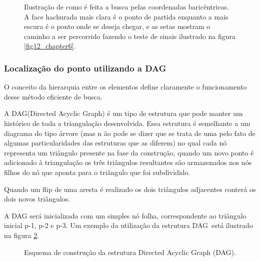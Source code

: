 \documentclass[12pt,a4paper]{book}
\begin{document}
\begin{figure}[htbp]
  \begin{center}
    \leavevmode
    
    \caption{Ilustra\c{c}\~{a}o de como \'e feita a busca pelas coordenadas baric\^entricas. A face hachurada mais clara \'e o ponto de partida enquanto a mais escura \'e o ponto onde se deseja chegar, e as setas mostram o caminho a ser percorrido fazendo o teste de sinais ilustrado na figura \ref{fig12_chapter6}.}
    \label{baricentricas}
  \end{center}
\end{figure}


\subsubsection{Localiza\c{c}\~{a}o do ponto utilizando a DAG} 

O conceito da hierarquia entre os elementos define claramente o
funcionamento desse m\'{e}todo eficiente de busca.

A DAG(Directed Acyclic Graph) \'{e} um tipo de estrutura que pode manter um
hist\'{o}rico de toda a triangula\c{c}\~{a}o desenvolvida. Essa estrutura 
\'{e} semelhante a um diagrama do tipo \'{a}rvore (mas n%
\~{a}o pode se dizer que se trata de uma pelo fato de algumas
particularidades das estruturas que as diferem) no qual cada n\'{o} representa
um tri\^{a}ngulo presente na fase da constru\c{c}\~{a}o, quando um novo
ponto \'{e} adicionado \`{a} triangula\c{c}\~{a}o os tr\^{e}s tri\^{a}ngulos
resultantes s\~{a}o armazenados nos n\'{o}s filhos do n\'{o} que aponta para
o tri\^{a}ngulo que foi subdividido.

Quando um flip de uma aresta \'{e} realizado os dois tri\^{a}ngulos
adjacentes conter\'{a} os dois novos tri\^{a}ngulos.

A DAG ser\'{a} inicializada com um simples n\'{o} folha, correspondente ao
tri\^{a}ngulo inicial p-1, p-2 e p-3. Um exemplo da utiliza\c{c}\~{a}o da estrutura DAG\ est\'{a}
ilustrado na figura \ref{fig13_chapter6}.

\begin{figure}[htbp]
  \begin{center}
    \leavevmode
    
    \caption{Esquema de constru\c{c}\~ao da estrutura Directed Acyclic Graph (DAG).}
    \label{fig13_chapter6}
  \end{center}
\end{figure}
\end{document}
